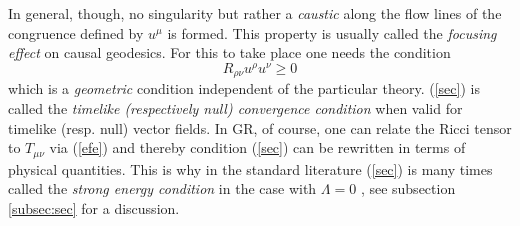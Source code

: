 \documentclass[12pt]{iopart}
\begin{document}
In general, though, no singularity but rather a {\em caustic} along the flow lines of the congruence 
defined by $u^{\mu}$ is formed. This property is usually called the 
{\em focusing effect} on causal geodesics. For this to take place one needs the condition 
\begin{equation}
R_{\rho\nu}u^{\rho}u^{\nu}\geq 0 \label{sec}
\end{equation}
which is a {\em geometric} condition independent of the particular theory. 
(\ref{sec}) is called the {\em timelike (respectively null) convergence condition} when valid for timelike (resp. null) vector fields. In GR, of course, one can relate the 
Ricci tensor to $T_{\mu\nu}$ via (\ref{efe}) and thereby condition (\ref{sec}) can be 
rewritten in terms of physical quantities. This is why in the standard literature (\ref{sec})  is many times called the {\em strong energy condition} in the case with $\Lambda =0$ \cite{HE}, see subsection \ref{subsec:sec} for a discussion.
\end{document}
